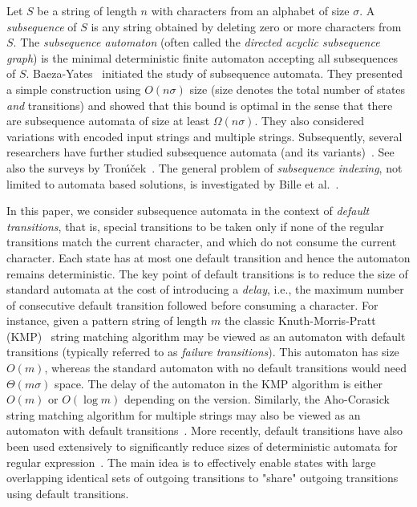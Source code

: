 \documentclass[a4paper,11pt]{article}
\begin{document}
Let $S$ be a string of length $n$ with characters from an alphabet of size $\sigma$. A \emph{subsequence} of $S$ is any string obtained by deleting zero or more characters from $S$. The \emph{subsequence automaton} (often called the \emph{directed acyclic subsequence graph}) is the minimal deterministic finite automaton accepting all subsequences of $S$. Baeza-Yates~\cite{BaezaYates1991} initiated the study of subsequence automata. They presented a simple construction using $O(n\sigma)$ size (size denotes the total number of states \emph{and} transitions) and showed that this bound is optimal in the sense that there are subsequence automata of size at least $\Omega(n \sigma)$. They also considered variations with encoded input strings and multiple strings. Subsequently, several researchers have further studied subsequence automata (and its variants)~\cite{tronivcek2005size,CMT2003,crochemore1999directed,Tronivcek2001episode,hoshino2000online,farhana2010finite,bannai2003inferring,tronivcek1999operations}. See also the surveys by Tron\'{\i}\v{c}ek~\cite{Tronicek2001,tronicek2003common}. The general problem of \emph{subsequence indexing}, not limited to automata based solutions, is investigated by Bille et al.~\cite{BFC2008}.

In this paper, we consider subsequence automata in the context of \emph{default transitions}, that is, special transitions to be taken only if none of the regular transitions match the current character, and which do not consume the current character. Each state has at most one default transition and hence the automaton remains deterministic. The key point of default transitions is to reduce the size of standard automata at the cost of introducing a \emph{delay}, i.e., the maximum number of consecutive default transition followed before consuming a character. 
For instance, given a pattern string of length $m$ the classic Knuth-Morris-Pratt (KMP)~\cite{KMP1977} string matching algorithm may be viewed as an automaton with default transitions (typically referred to as \emph{failure transitions}). This automaton has size $O(m)$, whereas the standard automaton with no default transitions would need $\Theta(m\sigma)$ space.
The delay of the automaton in the KMP algorithm is either $O(m)$ or $O(\log m)$ depending on the version. 
Similarly, the Aho-Corasick string matching algorithm for multiple strings may also be viewed as an automaton with default transitions~\cite{AC1975}. More recently, default transitions have also been used extensively to significantly reduce sizes of deterministic automata for regular expression~\cite{kumar2006algorithms,hayes2007dpico}. The main idea is to effectively enable states with large overlapping identical sets of outgoing transitions to "share" outgoing transitions using default transitions. 
\end{document}
